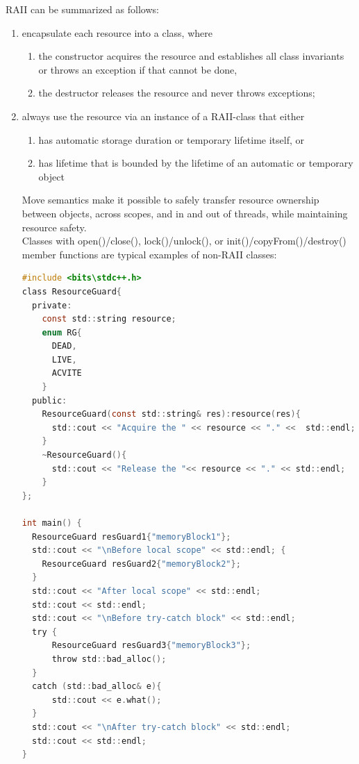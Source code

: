 \documentclass[a4paper]{exam}
\theoremstyle{definition}
\begin{document}
RAII can be summarized as follows:
\begin{enumerate}
  \item encapsulate each resource into a class, where
  \begin{enumerate}
    \item the constructor acquires the resource and establishes all class invariants or throws an exception if that cannot be done,
    \item the destructor releases the resource and never throws exceptions;
    
  \end{enumerate}
  \item always use the resource via an instance of a RAII-class that either
  \begin{enumerate}
    \item has automatic storage duration or temporary lifetime itself, or
\item    has lifetime that is bounded by the lifetime of an automatic or temporary object
  \end{enumerate}
  Move semantics make it possible to safely transfer resource ownership between objects, across scopes, and in and out of threads, while maintaining resource safety.
\\
  Classes with open()/close(), lock()/unlock(), or init()/copyFrom()/destroy() member functions are typical examples of non-RAII classes:

  \begin{lstlisting}[language=c]
#include <bits\stdc++.h>
class ResourceGuard{
  private:
    const std::string resource;
    enum RG{
      DEAD,
      LIVE,
      ACVITE
    }
  public:
    ResourceGuard(const std::string& res):resource(res){
      std::cout << "Acquire the " << resource << "." <<  std::endl;
    }
    ~ResourceGuard(){
      std::cout << "Release the "<< resource << "." << std::endl;
    }
};

int main() {
  ResourceGuard resGuard1{"memoryBlock1"};
  std::cout << "\nBefore local scope" << std::endl; {
    ResourceGuard resGuard2{"memoryBlock2"};
  }
  std::cout << "After local scope" << std::endl;
  std::cout << std::endl;
  std::cout << "\nBefore try-catch block" << std::endl;
  try {
      ResourceGuard resGuard3{"memoryBlock3"};
      throw std::bad_alloc();
  }   
  catch (std::bad_alloc& e){
      std::cout << e.what();
  }
  std::cout << "\nAfter try-catch block" << std::endl;
  std::cout << std::endl;
}
  \end{lstlisting}
\end{enumerate}
\end{document}
